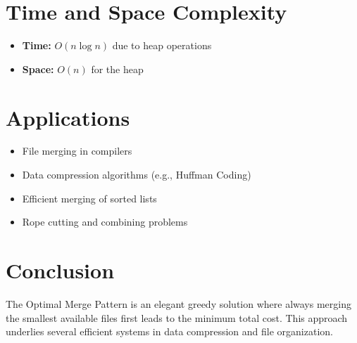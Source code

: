 \documentclass[14pt]{extarticle}
\begin{document}
\newpage
\section{Time and Space Complexity}
\begin{itemize}
    \item \textbf{Time:} $O(n \log n)$ due to heap operations
    \item \textbf{Space:} $O(n)$ for the heap
\end{itemize}

\section{Applications}
\begin{itemize}
    \item File merging in compilers
    \item Data compression algorithms (e.g., Huffman Coding)
    \item Efficient merging of sorted lists
    \item Rope cutting and combining problems
\end{itemize}

\section{Conclusion}
The Optimal Merge Pattern is an elegant greedy solution where always merging the smallest available files first leads to the minimum total cost. This approach underlies several efficient systems in data compression and file organization.
\end{document}
